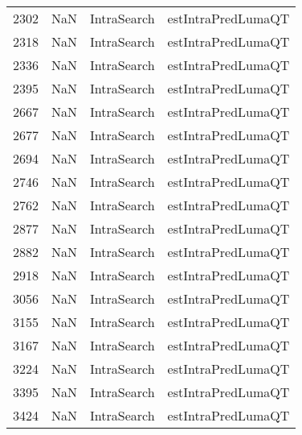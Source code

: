 \begin{tabular}{llll}
2302 &                   NaN &                IntraSearch &                        estIntraPredLumaQT \\
2318 &                   NaN &                IntraSearch &                        estIntraPredLumaQT \\
2336 &                   NaN &                IntraSearch &                        estIntraPredLumaQT \\
2395 &                   NaN &                IntraSearch &                        estIntraPredLumaQT \\
2667 &                   NaN &                IntraSearch &                        estIntraPredLumaQT \\
2677 &                   NaN &                IntraSearch &                        estIntraPredLumaQT \\
2694 &                   NaN &                IntraSearch &                        estIntraPredLumaQT \\
2746 &                   NaN &                IntraSearch &                        estIntraPredLumaQT \\
2762 &                   NaN &                IntraSearch &                        estIntraPredLumaQT \\
2877 &                   NaN &                IntraSearch &                        estIntraPredLumaQT \\
2882 &                   NaN &                IntraSearch &                        estIntraPredLumaQT \\
2918 &                   NaN &                IntraSearch &                        estIntraPredLumaQT \\
3056 &                   NaN &                IntraSearch &                        estIntraPredLumaQT \\
3155 &                   NaN &                IntraSearch &                        estIntraPredLumaQT \\
3167 &                   NaN &                IntraSearch &                        estIntraPredLumaQT \\
3224 &                   NaN &                IntraSearch &                        estIntraPredLumaQT \\
3395 &                   NaN &                IntraSearch &                        estIntraPredLumaQT \\
3424 &                   NaN &                IntraSearch &                        estIntraPredLumaQT \\

\end{tabular}
